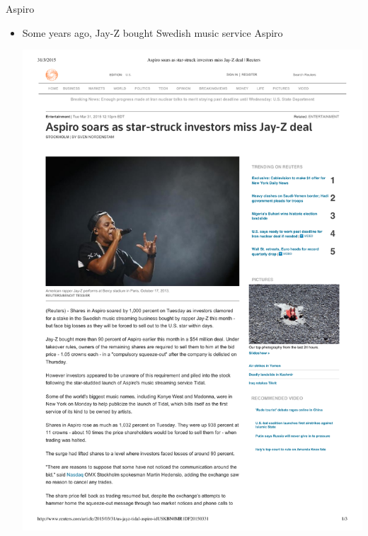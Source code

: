 \documentclass[english,10pt
,aspectratio=169
]{beamer}
\begin{document}
\begin{frame}[label=example]{Aspiro}
	\begin{itemize}
		\item Some years ago, Jay-Z bought Swedish music service Aspiro   
		\pause
		\begin{center}
			\includegraphics[width=.25\paperwidth]{pics/jayz}
		\end{center}
	\end{itemize}
\end{frame}
\end{document}
